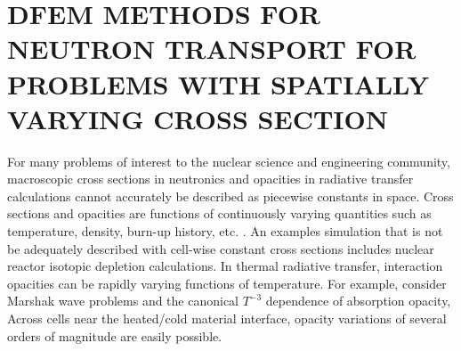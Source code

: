 %
%
%



\chapter{\uppercase{DFEM Methods for Neutron Transport for Problems with Spatially Varying Cross Section}}
\label{sec:chapter3_variable_xs}

For many problems of interest to the nuclear science and engineering community, macroscopic cross sections in neutronics and opacities in radiative transfer calculations cannot accurately be described as piecewise constants in space.  
Cross sections and opacities are functions of continuously varying quantities such as temperature, density, burn-up history, etc. \cite{xs_are_T_dependent}.
An examples simulation that is not be adequately described with cell-wise constant cross sections includes nuclear reactor isotopic depletion calculations.
In thermal radiative transfer, interaction opacities can be rapidly varying functions of temperature.  
For example, consider Marshak wave problems and the canonical $T^{-3}$ dependence \cite{ober_shadid} of absorption opacity, 
Across cells near the heated/cold material interface, opacity variations of several orders of magnitude are easily possible.

